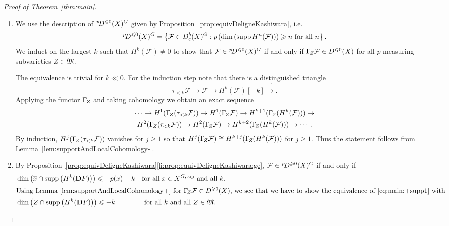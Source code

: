 \documentclass{compositio}
\theoremstyle{plain}
\theoremstyle{definition}
\theoremstyle{remark}
\newcommand\sheaf{\mathcal}
\newcommand\supp{\operatorname{supp}}
\newcommand\perv[1][p]{\mkern1mu{}^{#1}\mkern-3mu}
\newcommand\dualize{\mathbb D}
\newcommand\lc[1]{\Gamma_{\mkern-3mu#1}}
\newcommand\measuringFam{\mathfrak M}
\newcommand\Xtop[1][X]{#1^{G,\mathrm{top}}}
\begin{document}
\begin{proof}[Proof of Theorem~\ref{thm:main}]\leavevmode
\begin{enumerate}
\item 
    We use the description of $\perv[p] D^{\leq 0}(X)^G$ given by Proposition~\ref{prop:equivDeligneKashiwara}, i.e.
    \[
    \perv D^{\leq 0}(X)^G = \left\{ \sheaf F \in  D_c^b(X)^G : p\left(\dim\left( \supp H^{n}(\sheaf F) \right)\right) \geq  n \text{ for all $n$}\right\}.
    \]
    We induct on the largest $k$ such that $H^k(\sheaf F) \ne 0$ to show that $\sheaf F \in  \perv D^{\leq 0}(X)^G$ if and only if $\lc Z\sheaf F \in  D^{\leq 0}(X)$ for all $p$-measuring subvarieties $Z \in  \measuringFam$.

    The equivalence is trivial for $k \ll 0$.
    For the induction step note that there is a distinguished triangle
    \[
    \tau _{<k} \sheaf F \to  \sheaf F \to  H^k(\sheaf F)[-k] \xrightarrow{+1}.
    \]
    Applying the functor $\lc Z$ and taking cohomology we obtain an exact sequence
    \begin{multline*}
        \cdots \to 
        H^1(\lc Z(\tau _{<k} \sheaf F)) \to 
        H^1(\lc Z\sheaf F) \to 
        H^{k+1}(\lc Z(H^k(\sheaf F))) \to  \\
        H^2(\lc Z(\tau _{<k} \sheaf F)) \to 
        H^2(\lc Z\sheaf F) \to 
        H^{k+2}(\lc Z(H^k(\sheaf F))) \to 
        \cdots.
    \end{multline*}
    By induction, $H^j(\lc Z(\tau _{<k} \sheaf F))$ vanishes for $j \geq  1$ so that $H^j(\lc Z\sheaf F) \cong H^{k+j}(\lc Z(H^k(\sheaf F)))$ for $j \geq  1$.
    Thus the statement follows from Lemma~\ref{lem:supportAndLocalCohomology-}.
\item 
    By Proposition~\ref{prop:equivDeligneKashiwara}\ref{li:prop:equivDeligneKashiwara:ge}, $\sheaf F \in  \perv D^{\geq 0}(X)^G$ if and only if
    \begin{align}
        \label{eq:main:+supp1}%
        & \dim\left( \overline x \cap  \supp\left( H^k(\dualize F) \right) \right) \leq  -p(x) - k &&  \text{for all $x \in  \Xtop$ and all $k$}. \\
        \intertext{Using Lemma~\ref{lem:supportAndLocalCohomology+} for $\lc Z\sheaf F \in  D^{\geq 0}(X)$, we see that we have to show the equivalence of \eqref{eq:main:+supp1} with}
        \notag
        & \dim\left( Z \cap  \supp\left( H^k(\dualize F) \right) \right) \leq  - k && \text{ for all $k$ and all $Z \in  \measuringFam$}. \\

\end{align}
\end{enumerate}
\end{proof}
\end{document}
